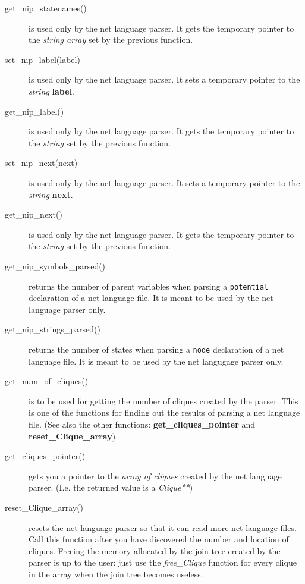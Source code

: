 \documentclass[12pt,a4paper]{report}
\begin{document}
\begin{description}
\item[get\_nip\_statenames()] is used only by the net language
parser. It gets the temporary pointer to the {\it string array}
set by the previous function. 

\item[set\_nip\_label(label)] is used only by the net language
parser. It sets a temporary pointer to the {\it string}
\textbf{label}.

\item[get\_nip\_label()] is used only by the net language
parser. It gets the temporary pointer to the {\it string}
set by the previous function.

\item[set\_nip\_next(next)] is used only by the net language
parser. It sets a temporary pointer to the {\it string}
\textbf{next}.

\item[get\_nip\_next()] is used only by the net language
parser. It gets the temporary pointer to the {\it string}
set by the previous function.

\item[get\_nip\_symbols\_parsed()] returns the number of parent
variables when parsing a \verb+potential+ declaration of a net
language file. It is meant to be used by the net language parser only.

\item[get\_nip\_strings\_parsed()] returns the number of states when
parsing a \verb+node+ declaration of a net language file. It is meant
to be used by the net langugage parser only.

\item[get\_num\_of\_cliques()] is to be used for getting the number of
cliques created by the parser. This is one of the functions for
finding out the results of parsing a net language file. (See also the
other functions: \textbf{get\_cliques\_pointer} and
\textbf{reset\_Clique\_array}) 

\item[get\_cliques\_pointer()] gets you a pointer to the {\it array of
cliques} created by the net language parser. (I.e. the returned value
is a {\it Clique**})

\item[reset\_Clique\_array()] resets the net language parser so that
it can read more net language files. Call this function after you have
discovered the number and location of cliques. Freeing the memory
allocated by the join tree created by the parser is up to the user: 
just use the {\it free\_Clique} function for every clique in the array
when the join tree becomes useless.

\end{description}
\end{document}
